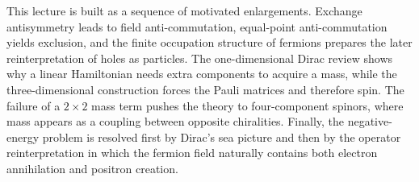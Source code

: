 This lecture is built as a sequence of motivated enlargements. Exchange antisymmetry leads to field anti-commutation, equal-point anti-commutation yields exclusion, and the finite occupation structure of fermions prepares the later reinterpretation of holes as particles. The one-dimensional Dirac review shows why a linear Hamiltonian needs extra components to acquire a mass, while the three-dimensional construction forces the Pauli matrices and therefore spin. The failure of a \(2\times2\) mass term pushes the theory to four-component spinors, where mass appears as a coupling between opposite chiralities. Finally, the negative-energy problem is resolved first by Dirac's sea picture and then by the operator reinterpretation in which the fermion field naturally contains both electron annihilation and positron creation.